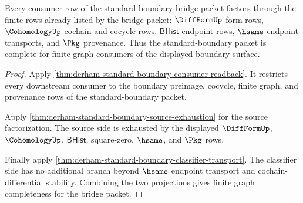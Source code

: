 \begin{theorem}
\label{thm:derham-standard-boundary-finite-graph-completeness}
Every consumer row of the standard-boundary bridge packet factors through the
finite rows already listed by the bridge packet: $\DiffFormUp$ form rows,
$\CohomologyUp$ cochain and cocycle rows, $\mathsf{BHist}$ endpoint rows,
$\hsame$ endpoint transports, and $\Pkg$ provenance. Thus the standard-boundary
packet is complete for finite graph consumers of the displayed boundary
surface.
\end{theorem}
\begin{proof}
Apply \autoref{thm:derham-standard-boundary-consumer-readback}. It restricts
every downstream consumer to the boundary preimage, cocycle, finite graph, and
provenance rows of the standard-boundary packet.

Apply \autoref{thm:derham-standard-boundary-source-exhaustion} for the source
factorization. The source side is exhausted by the displayed $\DiffFormUp$,
$\CohomologyUp$, $\mathsf{BHist}$, square-zero, $\hsame$, and $\Pkg$ rows.

Finally apply \autoref{thm:derham-standard-boundary-classifier-transport}. The
classifier side has no additional branch beyond $\hsame$ endpoint transport and
cochain-differential stability. Combining the two projections gives finite
graph completeness for the bridge packet.
\end{proof}
